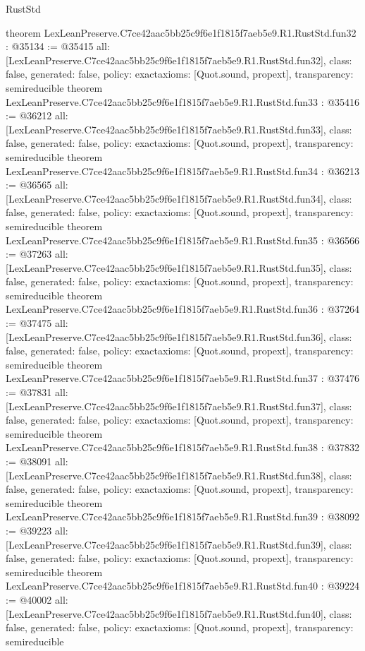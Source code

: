 \begin{lexlean}{RustStd}
\begin{coremodule}
{}
theorem LexLeanPreserve.C7ce42aac5bb25c9f6e1f1815f7aeb5e9.R1.RustStd.fun32 : @35134 := @35415 {
  all: [LexLeanPreserve.C7ce42aac5bb25c9f6e1f1815f7aeb5e9.R1.RustStd.fun32],
  class: false,
  generated: false,
  policy: exact{axioms: [Quot.sound, propext]},
  transparency: semireducible
}
theorem LexLeanPreserve.C7ce42aac5bb25c9f6e1f1815f7aeb5e9.R1.RustStd.fun33 : @35416 := @36212 {
  all: [LexLeanPreserve.C7ce42aac5bb25c9f6e1f1815f7aeb5e9.R1.RustStd.fun33],
  class: false,
  generated: false,
  policy: exact{axioms: [Quot.sound, propext]},
  transparency: semireducible
}
theorem LexLeanPreserve.C7ce42aac5bb25c9f6e1f1815f7aeb5e9.R1.RustStd.fun34 : @36213 := @36565 {
  all: [LexLeanPreserve.C7ce42aac5bb25c9f6e1f1815f7aeb5e9.R1.RustStd.fun34],
  class: false,
  generated: false,
  policy: exact{axioms: [Quot.sound, propext]},
  transparency: semireducible
}
theorem LexLeanPreserve.C7ce42aac5bb25c9f6e1f1815f7aeb5e9.R1.RustStd.fun35 : @36566 := @37263 {
  all: [LexLeanPreserve.C7ce42aac5bb25c9f6e1f1815f7aeb5e9.R1.RustStd.fun35],
  class: false,
  generated: false,
  policy: exact{axioms: [Quot.sound, propext]},
  transparency: semireducible
}
theorem LexLeanPreserve.C7ce42aac5bb25c9f6e1f1815f7aeb5e9.R1.RustStd.fun36 : @37264 := @37475 {
  all: [LexLeanPreserve.C7ce42aac5bb25c9f6e1f1815f7aeb5e9.R1.RustStd.fun36],
  class: false,
  generated: false,
  policy: exact{axioms: [Quot.sound, propext]},
  transparency: semireducible
}
theorem LexLeanPreserve.C7ce42aac5bb25c9f6e1f1815f7aeb5e9.R1.RustStd.fun37 : @37476 := @37831 {
  all: [LexLeanPreserve.C7ce42aac5bb25c9f6e1f1815f7aeb5e9.R1.RustStd.fun37],
  class: false,
  generated: false,
  policy: exact{axioms: [Quot.sound, propext]},
  transparency: semireducible
}
theorem LexLeanPreserve.C7ce42aac5bb25c9f6e1f1815f7aeb5e9.R1.RustStd.fun38 : @37832 := @38091 {
  all: [LexLeanPreserve.C7ce42aac5bb25c9f6e1f1815f7aeb5e9.R1.RustStd.fun38],
  class: false,
  generated: false,
  policy: exact{axioms: [Quot.sound, propext]},
  transparency: semireducible
}
theorem LexLeanPreserve.C7ce42aac5bb25c9f6e1f1815f7aeb5e9.R1.RustStd.fun39 : @38092 := @39223 {
  all: [LexLeanPreserve.C7ce42aac5bb25c9f6e1f1815f7aeb5e9.R1.RustStd.fun39],
  class: false,
  generated: false,
  policy: exact{axioms: [Quot.sound, propext]},
  transparency: semireducible
}
theorem LexLeanPreserve.C7ce42aac5bb25c9f6e1f1815f7aeb5e9.R1.RustStd.fun40 : @39224 := @40002 {
  all: [LexLeanPreserve.C7ce42aac5bb25c9f6e1f1815f7aeb5e9.R1.RustStd.fun40],
  class: false,
  generated: false,
  policy: exact{axioms: [Quot.sound, propext]},
  transparency: semireducible
}
\end{coremodule}
\end{lexlean}
